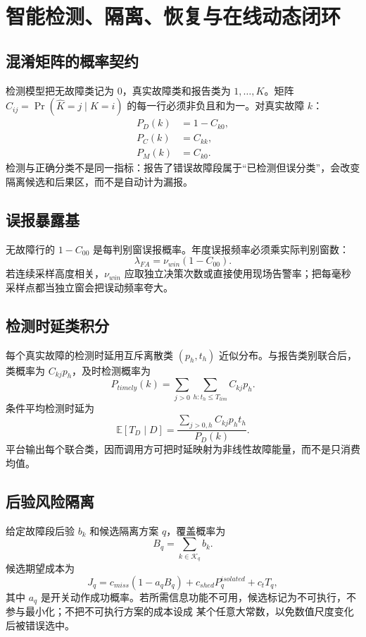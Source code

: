 \section{智能检测、隔离、恢复与在线动态闭环}\label{sec:rel-intelligent-online}

\subsection{混淆矩阵的概率契约}
检测模型把无故障类记为 $0$，真实故障类和报告类为 $1,\ldots,K$。矩阵
$C_{ij}=\Pr(\widehat K=j\mid K=i)$ 的每一行必须非负且和为一。对真实故障 $k$：
\begin{align}
 P_D(k)&=1-C_{k0},\\
 P_C(k)&=C_{kk},\\
 P_M(k)&=C_{k0}.
\end{align}
检测与正确分类不是同一指标：报告了错误故障段属于“已检测但误分类”，会改变隔离候选和后果区，而不是自动计为漏报。

\subsection{误报暴露基}
无故障行的 $1-C_{00}$ 是每判别窗误报概率。年度误报频率必须乘实际判别窗数：
\begin{equation}
 \lambda_{FA}=\nu_{win}(1-C_{00}).
\end{equation}
若连续采样高度相关，$\nu_{win}$ 应取独立决策次数或直接使用现场告警率；把每毫秒采样点都当独立窗会把误动频率夸大。

\subsection{检测时延类积分}
每个真实故障的检测时延用互斥离散类 $(p_h,t_h)$ 近似分布。与报告类别联合后，类概率为 $C_{kj}p_h$，及时检测概率为
\begin{equation}
 P_{timely}(k)=\sum_{j>0}\sum_{h:t_h\le T_{lim}}C_{kj}p_h.
\end{equation}
条件平均检测时延为
\begin{equation}
 \mathbb E[T_D\mid D]=
 \frac{\sum_{j>0,h}C_{kj}p_ht_h}{P_D(k)}.
\end{equation}
平台输出每个联合类，因而调用方可把时延映射为非线性故障能量，而不是只消费均值。

\subsection{后验风险隔离}
给定故障段后验 $b_k$ 和候选隔离方案 $q$，覆盖概率为
\begin{equation}
 B_q=\sum_{k\in\mathcal K_q}b_k.
\end{equation}
候选期望成本为
\begin{equation}
 J_q=c_{miss}(1-a_qB_q)+c_{shed}P_q^{isolated}+c_tT_q,
\end{equation}
其中 $a_q$ 是开关动作成功概率。若所需信息功能不可用，候选标记为不可执行，不参与最小化；不把不可执行方案的成本设成
某个任意大常数，以免数值尺度变化后被错误选中。

